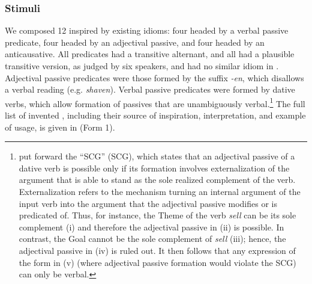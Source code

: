 \documentclass[output=paper]{langsci/langscibook}
\begin{document}
\subsubsection{Stimuli} 
We composed 12   inspired by existing
 idioms: four headed by a verbal passive predicate,
four headed by an
adjectival passive, and four headed by an anticausative. All predicates had a
transitive alternant, and all  had a plausible transitive version,
as judged by six speakers, and had no similar idiom in . Adjectival
passive predicates were those formed by the suffix \emph{-en}, which disallows
a verbal reading (e.g. \emph{shaven}). Verbal passive predicates were formed
by dative verbs, which allow formation of passives that are unambiguously
verbal.\footnote{\textcite{LevRap1986} put forward the \enquote{\glsdesc{SCG}}
    (\gls{SCG}), which states that an adjectival passive of a
    dative verb is possible only if its formation involves externalization of
    the argument that is able to stand as the sole realized complement of the
    verb.  Externalization refers to the mechanism turning an internal argument
    of the input verb into the argument that the adjectival passive modifies or
    is predicated of.  Thus, for instance, the Theme of the verb \emph{sell}
    can be its sole complement (i) and therefore the adjectival passive in (ii)
    is possible. In contrast, the Goal cannot be the sole complement of
    \emph{sell} (iii); hence, the adjectival passive in (iv) is ruled out. It
    then follows that any expression of the form in (v) (where adjectival
    passive formation would violate the \gls{SCG}) can only be verbal.

   \z} The full list of invented , including their 
    source of inspiration, interpretation, and example of usage, is given in
     (Form 1).
\end{document}
